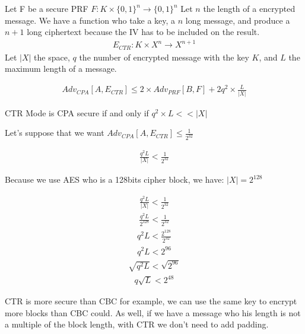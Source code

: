 \documentclass[10pt,a4paper]{report}
\begin{document}
Let F be a secure PRF $F: K \times \{0,1\}^n \rightarrow \{0,1\}^n$ \newline
Let $n$ the length of a encrypted message. We have a function who take a key, a $n$ long message, and produce a $n+1$ long ciphertext because the IV has to be included on the result. 
\begin{align*} 
E_{CTR}: K \times X^n \rightarrow X^{n+1}
\end{align*} 
Let $ |X| $ the space, $q$ the number of encrypted message with the key $K$, and $L$ the maximum length of a message. \cite{danbohen}  \newline \newline

\begin{align*} 
Adv_{CPA}[A,E_{CTR}] \le 2 \times Adv_{PRF}[B,F] + 2q^{2} \times \frac{L}{|X|}
\end{align*} 

CTR Mode is CPA secure if and only if $q^{2} \times L  << |X| $ \newline

Let's suppose that we want $ Adv_{CPA}[A,E_{CTR}] \le \frac{1}{2^{32}} $ \newline

\begin{align*}
\frac{q^{2}L}{|X|} < \frac{1}{2^{32}}
\end{align*}

Because we use AES who is a 128bits cipher block, we have: $|X| = 2^{128}$ \newline

\begin{align*}
\frac{q^{2}L}{|X|} < \frac{1}{2^{32}}
\end{align*}
\begin{align*}
\frac{q^{2}L}{2^{128}} < \frac{1}{2^{32}}
\end{align*}
\begin{align*}
q^{2}L < \frac{2^{128}}{2^{32}}
\end{align*}
\begin{align*}
q^{2}L < 2^{96}
\end{align*}
\begin{align*}
\sqrt{q^{2}L} < \sqrt{2^{96}}
\end{align*}
\begin{align*}
q\sqrt{L} < 2^{48}
\end{align*}

CTR is more secure than CBC for example, we can use the same key to encrypt more blocks than CBC could.
As well, if we have a message who his length is not a multiple of the block length, with CTR we don't need to add padding.\newline
\end{document}
